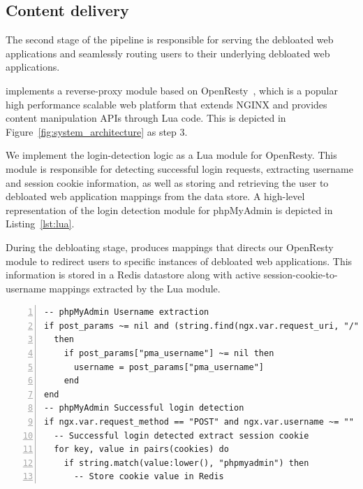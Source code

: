 \subsection{Content delivery}

The second stage of the \sys{} pipeline is responsible for serving the debloated web applications and seamlessly routing users to their underlying debloated web applications. 

\sys{} implements a reverse-proxy module based on OpenResty~\cite{openresty}, which is a popular high performance scalable web platform that extends NGINX and provides content manipulation APIs through Lua code. 
This is depicted in Figure~\ref{fig:system_architecture} as step 3. 

We implement the login-detection logic as a Lua module for OpenResty. 
This module is responsible for detecting successful login requests, extracting username and session cookie information, as well as storing and retrieving the user to debloated web application mappings from the data store. 
A high-level representation of the login detection module for phpMyAdmin is depicted in Listing~\ref{lst:lua}.

During the debloating stage, \sys{} produces mappings that directs our OpenResty module to redirect users to specific instances of debloated web applications. 
This information is stored in a Redis datastore along with active session-cookie-to-username mappings extracted by the Lua module. 

\begin{lstlisting}[caption=LUA configuration to detect successful logins and extract authentication cookies for phpMyAdmin,label=lst:lua,basicstyle=\footnotesize, float=tp, floatplacement=tbp, language={[5.0]Lua},commentstyle=\color{commentsColor}\textit, numbers=left, xleftmargin=5.0ex, breaklines=true]
-- phpMyAdmin Username extraction
if post_params ~= nil and (string.find(ngx.var.request_uri, "/") or string.find(ngx.var.request_uri, "index.php")) 
  then
    if post_params["pma_username"] ~= nil then
      username = post_params["pma_username"]
    end
end
-- phpMyAdmin Successful login detection
if ngx.var.request_method == "POST" and ngx.var.username ~= "" and ngx.status == 302 then
  -- Successful login detected extract session cookie
  for key, value in pairs(cookies) do
    if string.match(value:lower(), "phpmyadmin") then
      -- Store cookie value in Redis
\end{lstlisting}

